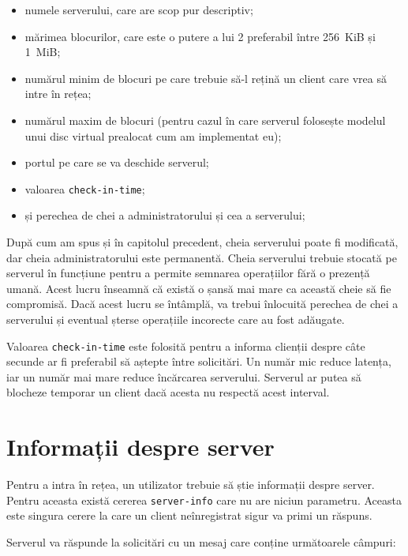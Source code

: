 \documentclass[a4wide,12pt]{report}
\newcommand{\cod}[1]{\texttt{#1}}
\begin{document}
\begin{itemize}
    \item numele serverului, care are scop pur descriptiv;
    \item mărimea blocurilor, care este o putere a lui 2 preferabil între 256~KiB și 1~MiB;
    \item numărul minim de blocuri pe care trebuie să-l rețină un client care vrea să intre în rețea;
    \item numărul maxim de blocuri (pentru cazul în care serverul folosește modelul unui disc virtual prealocat cum am
    implementat eu);
    \item portul pe care se va deschide serverul;
    \item valoarea \cod{check-in-time};
    \item și perechea de chei a administratorului și cea a serverului;
\end{itemize}

După cum am spus și în capitolul precedent, cheia serverului poate fi modificată, dar cheia administratorului este
permanentă. Cheia serverului trebuie stocată pe serverul în funcțiune pentru a permite semnarea operațiilor fără o
prezență umană. Acest lucru înseamnă că există o șansă mai mare ca această cheie să fie compromisă. Dacă acest lucru se
întâmplă, va trebui înlocuită perechea de chei a serverului și eventual șterse operațiile incorecte care au fost
adăugate.

Valoarea \cod{check-in-time} este folosită pentru a informa clienții despre câte secunde ar fi preferabil să aștepte
între solicitări. Un număr mic reduce latența, iar un număr mai mare reduce încărcarea serverului. Serverul ar putea să
blocheze temporar un client dacă acesta nu respectă acest interval.

\section{Informații despre server} %

Pentru a intra în rețea, un utilizator trebuie să știe informații despre server. Pentru aceasta există cererea
\cod{server-info} care nu are niciun parametru. Aceasta este singura cerere la care un client neînregistrat sigur va
primi un răspuns.

Serverul va răspunde la solicitări cu un mesaj care conține următoarele câmpuri:
\end{document}
